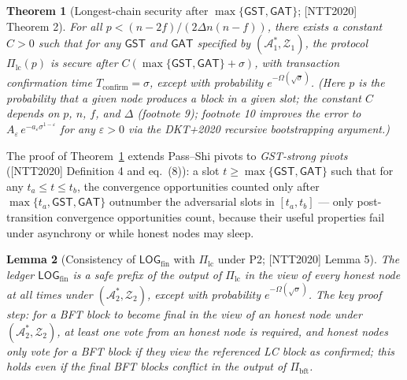\documentclass[11pt,a4paper]{article}
\newtheorem{theorem}{Theorem}[section]
\newtheorem{lemma}[theorem]{Lemma}
\theoremstyle{definition}
\begin{document}
\begin{theorem}[Longest-chain security after
$\max\{\mathsf{GST},\mathsf{GAT}\}$; {[NTT2020]} Theorem 2]
\label{thm:xl-lc-after-gst}
For all $p < (n - 2f) / (2 \Delta n (n - f))$, there exists a constant
$C > 0$ such that for any $\mathsf{GST}$ and $\mathsf{GAT}$ specified by
$(\mathcal{A}_1^*, \mathcal{Z}_1)$, the protocol $\Pi_{\mathrm{lc}}(p)$ is
secure after $C(\max\{\mathsf{GST}, \mathsf{GAT}\} + \sigma)$, with
transaction confirmation time $T_{\mathrm{confirm}} = \sigma$, except with
probability $e^{-\Omega(\sqrt{\sigma})}$. (Here $p$ is the probability
that a given node produces a block in a given slot; the constant $C$
depends on $p$, $n$, $f$, and $\Delta$ (footnote 9); footnote 10 improves
the error to $A_\varepsilon\, e^{-a_\varepsilon \sigma^{1-\varepsilon}}$
for any $\varepsilon > 0$ via the DKT+2020 recursive bootstrapping
argument.)
\end{theorem}

The proof of Theorem~\ref{thm:xl-lc-after-gst} extends Pass--Shi pivots to
\emph{GST-strong pivots} ([NTT2020] Definition 4 and eq.~(8)): a slot
$t \ge \max\{\mathsf{GST}, \mathsf{GAT}\}$ such that for any $t_a \le t
\le t_b$, the convergence opportunities counted only after
$\max\{t_a, \mathsf{GST}, \mathsf{GAT}\}$ outnumber the adversarial slots
in $[t_a, t_b]$ --- only post-transition convergence opportunities count,
because their useful properties fail under asynchrony or while honest
nodes may sleep.

\begin{lemma}[Consistency of $\mathsf{LOG}_{\mathrm{fin}}$ with
$\Pi_{\mathrm{lc}}$ under P2; {[NTT2020]} Lemma 5]\label{lem:xl-ntt-l5}
The ledger $\mathsf{LOG}_{\mathrm{fin}}$ is a safe prefix of the output of
$\Pi_{\mathrm{lc}}$ in the view of every honest node at all times under
$(\mathcal{A}_2^*, \mathcal{Z}_2)$, except with probability
$e^{-\Omega(\sqrt{\sigma})}$. The key proof step: for a BFT block to
become final in the view of an honest node under
$(\mathcal{A}_2^*, \mathcal{Z}_2)$, at least one vote from an honest node
is required, and honest nodes only vote for a BFT block if they view the
referenced LC block as confirmed; this holds even if the final BFT blocks
conflict in the output of $\Pi_{\mathrm{bft}}$.
\end{lemma}
\end{document}
